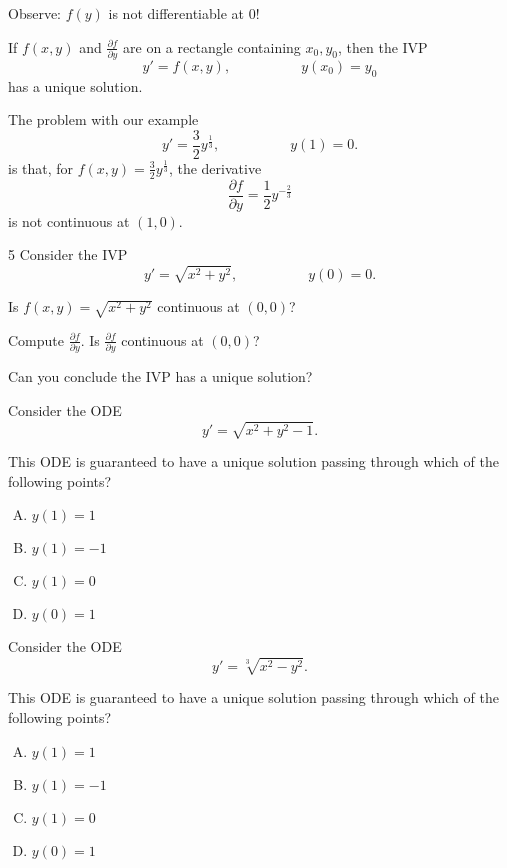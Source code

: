 \begin{applicationActivities}
\begin{observation}
\vfill
Observe: \(f(y)\) is not differentiable at \(0\)!
\end{observation}

\begin{observation}
If \(f(x,y)\) and \(\frac{\partial f}{\partial y}\) are  on a rectangle containing \(x_0,y_0\), then the IVP
\[ y'=f(x,y), \hspace{5em} y(x_0)=y_0\]
has a unique solution.

\vfill
The problem with our example \[y'=\frac{3}{2}y^\frac{1}{3}, \hspace{5em} y(1)=0.\]
 is that, for \(f(x,y)=\frac{3}{2} y^\frac{1}{3}\), the derivative \[\frac{\partial f}{\partial y} = \frac{1}{2} y^{-\frac{2}{3}}\] is not continuous at \((1,0)\).
\end{observation}

\begin{activity} {5}
Consider the IVP
\[ y'= \sqrt{x^2+y^2}, \hspace{5em} y(0)=0 .\]

\begin{subactivity}
Is \(f(x,y)=\sqrt{x^2+y^2}\) continuous at \((0,0)\)?
\end{subactivity}
\begin{subactivity}
Compute \(\frac{\partial f}{\partial y}\).  Is \(\frac{\partial f}{\partial y}\) continuous at \((0,0)\)?
\end{subactivity}
\begin{subactivity}
Can you conclude the IVP has a unique solution?
\end{subactivity}
\end{activity}

\begin{activity}{10}
Consider the ODE 
\[ y'= \sqrt{x^2+y^2-1}.\]

This ODE is guaranteed to have a unique solution passing through which of the following points?
\begin{enumerate}[(A)]
\item \(y(1)=1\) 
\item \(y(1)=-1\) 
\item \(y(1)=0\) 
\item \(y(0)=1\) 
\end{enumerate}
\end{activity}

\begin{activity}{10}
Consider the ODE 
\[ y'= \sqrt[3]{x^2-y^2}.\]

This ODE is guaranteed to have a unique solution passing through which of the following points?
\begin{enumerate}[(A)]
\item \(y(1)=1\) 
\item \(y(1)=-1\) 
\item \(y(1)=0\) 
\item \(y(0)=1\) 
\end{enumerate}
\end{activity}



\end{applicationActivities}
